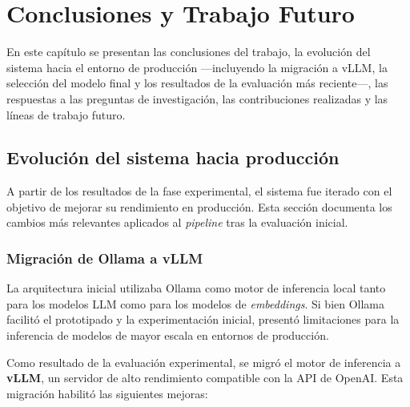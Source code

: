 \chapter{Conclusiones y Trabajo Futuro}\label{cap:conclusiones}

En este capítulo se presentan las conclusiones del trabajo, la evolución del sistema hacia el entorno de producción —incluyendo la migración a vLLM, la selección del modelo final y los resultados de la evaluación más reciente—, las respuestas a las preguntas de investigación, las contribuciones realizadas y las líneas de trabajo futuro.

\section{Evolución del sistema hacia producción}\label{sec:evolucion}

A partir de los resultados de la fase experimental, el sistema fue iterado con el objetivo de mejorar su rendimiento en producción. Esta sección documenta los cambios más relevantes aplicados al \textit{pipeline} tras la evaluación inicial.

\subsection{Migración de Ollama a vLLM}\label{sec:migracion_vllm}

La arquitectura inicial utilizaba Ollama como motor de inferencia local tanto para los modelos LLM como para los modelos de \textit{embeddings}. Si bien Ollama facilitó el prototipado y la experimentación inicial, presentó limitaciones para la inferencia de modelos de mayor escala en entornos de producción.

Como resultado de la evaluación experimental, se migró el motor de inferencia a \textbf{vLLM}, un servidor de alto rendimiento compatible con la API de OpenAI. Esta migración habilitó las siguientes mejoras:

